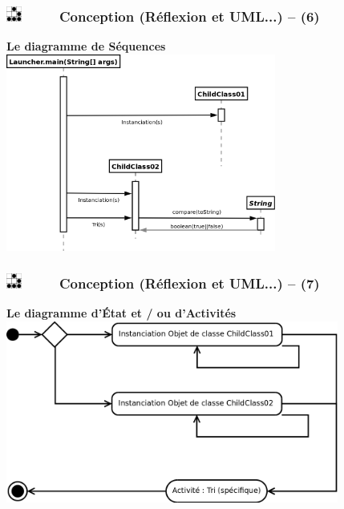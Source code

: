 \documentclass[slidetop,11pt]{beamer}
\def\sectionPartIaUN{Conception (R{\'e}flexion et UML...) -- }
\def\moreInFrameTitle{\includegraphics[height=0.5cm]{img/logo_glider.png}~~~~~}
\begin{document}
\begin{frame}
	\frametitle{\moreInFrameTitle \sectionPartIaUN (6)}
	\textbf{Le diagramme de S{\'e}quences}
	\includegraphics[height=6.5cm]{img/diagrammeSequence.png}
\end{frame} 

\begin{frame}
	\frametitle{\moreInFrameTitle \sectionPartIaUN (7)}
	\textbf{Le diagramme d'{\'E}tat et / ou d'Activit{\'e}s}
	\includegraphics[height=6.0cm]{img/diagrammeEtatActivite.png}
\end{frame} 
\end{document}
